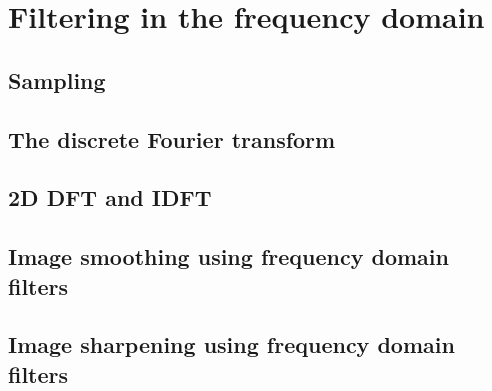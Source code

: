 \section{Filtering in the frequency domain}
\subsection{Sampling}

\subsection{The discrete Fourier transform}

\subsection{2D DFT and IDFT}

\subsection{Image smoothing using frequency domain filters}

\subsection{Image sharpening using frequency domain filters}


